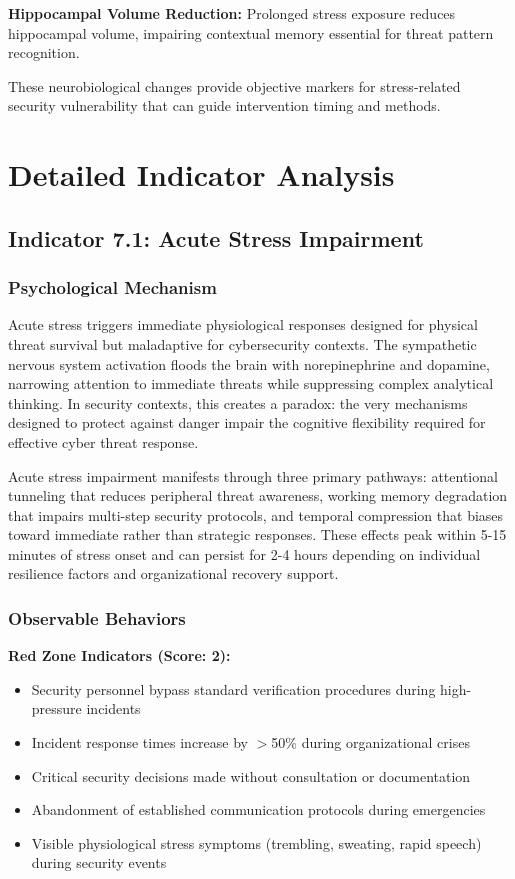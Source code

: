 \documentclass[11pt,a4paper]{article}
\begin{document}
\textbf{Hippocampal Volume Reduction:} Prolonged stress exposure reduces hippocampal volume, impairing contextual memory essential for threat pattern recognition\cite{mcewen2012}.

These neurobiological changes provide objective markers for stress-related security vulnerability that can guide intervention timing and methods.

\section{Detailed Indicator Analysis}

\subsection{Indicator 7.1: Acute Stress Impairment}

\subsubsection{Psychological Mechanism}

Acute stress triggers immediate physiological responses designed for physical threat survival but maladaptive for cybersecurity contexts. The sympathetic nervous system activation floods the brain with norepinephrine and dopamine, narrowing attention to immediate threats while suppressing complex analytical thinking\cite{arnsten2015}. In security contexts, this creates a paradox: the very mechanisms designed to protect against danger impair the cognitive flexibility required for effective cyber threat response.

Acute stress impairment manifests through three primary pathways: attentional tunneling that reduces peripheral threat awareness, working memory degradation that impairs multi-step security protocols, and temporal compression that biases toward immediate rather than strategic responses. These effects peak within 5-15 minutes of stress onset and can persist for 2-4 hours depending on individual resilience factors and organizational recovery support\cite{lupien2009}.

\subsubsection{Observable Behaviors}

\textbf{Red Zone Indicators (Score: 2):}
\begin{itemize}
\item Security personnel bypass standard verification procedures during high-pressure incidents
\item Incident response times increase by $>$50\% during organizational crises
\item Critical security decisions made without consultation or documentation
\item Abandonment of established communication protocols during emergencies
\item Visible physiological stress symptoms (trembling, sweating, rapid speech) during security events
\end{itemize}
\end{document}
